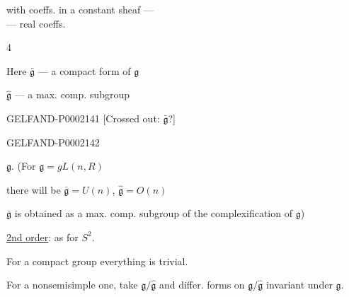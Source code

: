 \begin{flushright}\begin{minipage}{.55\linewidth}
with coeffs. in a constant sheaf ---\\--- real coeffs.
\end{minipage}\end{flushright}





\begin{flushright}$4$\end{flushright}



Here $\bar{\mathfrak g}$ --- a compact form of $\mathfrak g$



$\hat{\mathfrak g}$ --- a max. comp. subgroup



\begin{GelfandAdjacentEvidence}{GELFAND-P000214}{1}
[Crossed out: $\bar{\mathfrak g}$?]
\end{GelfandAdjacentEvidence}
\begin{GelfandAdjacentEvidence}{GELFAND-P000214}{2}

$\mathfrak g$.
(For $\mathfrak g=gL (n, R)$
\end{GelfandAdjacentEvidence}

there will be $\bar{\mathfrak g}=U (n)$, $\hat{\mathfrak g}=O (n)$



$\bar{\mathfrak g}$ is obtained as a max. comp. subgroup of the complexification of $\mathfrak g$)



\underline{2nd order}: as for $S^2$.



For a compact group everything is trivial.



For a nonsemisimple one, take $\mathfrak g/\hat{\mathfrak g}$ and differ. forms on $\mathfrak g/\hat{\mathfrak g}$ invariant under $\mathfrak g$.



